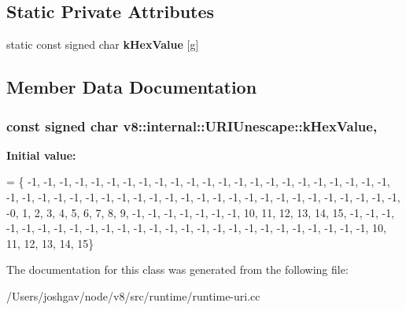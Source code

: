 \subsection*{Static Private Attributes}
\begin{DoxyCompactItemize}
\item 
static const signed char {\bfseries k\+Hex\+Value} \mbox{[}\textquotesingle{}g\textquotesingle{}\mbox{]}
\end{DoxyCompactItemize}


\subsection{Member Data Documentation}
\subsubsection[{\texorpdfstring{k\+Hex\+Value}{kHexValue}}]{\setlength{\rightskip}{0pt plus 5cm}const signed char v8\+::internal\+::\+U\+R\+I\+Unescape\+::k\+Hex\+Value\hspace{0.3cm}{\ttfamily [static]}, {\ttfamily [private]}}\hypertarget{classv8_1_1internal_1_1_u_r_i_unescape_ac7732c88336f23aa0f0525d9c083be40}{}\label{classv8_1_1internal_1_1_u_r_i_unescape_ac7732c88336f23aa0f0525d9c083be40}
{\bfseries Initial value\+:}
\begin{DoxyCode}
= \{
    -1, -1, -1, -1, -1, -1, -1, -1, -1, -1, -1, -1, -1, -1, -1, -1, -1, -1,
    -1, -1, -1, -1, -1, -1, -1, -1, -1, -1, -1, -1, -1, -1, -1, -1, -1, -1,
    -1, -1, -1, -1, -1, -1, -1, -1, -1, -1, -1, -1, -0, 1,  2,  3,  4,  5,
    6,  7,  8,  9,  -1, -1, -1, -1, -1, -1, -1, 10, 11, 12, 13, 14, 15, -1,
    -1, -1, -1, -1, -1, -1, -1, -1, -1, -1, -1, -1, -1, -1, -1, -1, -1, -1,
    -1, -1, -1, -1, -1, -1, -1, 10, 11, 12, 13, 14, 15\}
\end{DoxyCode}


The documentation for this class was generated from the following file\+:\begin{DoxyCompactItemize}
\item 
/\+Users/joshgav/node/v8/src/runtime/runtime-\/uri.\+cc\end{DoxyCompactItemize}
